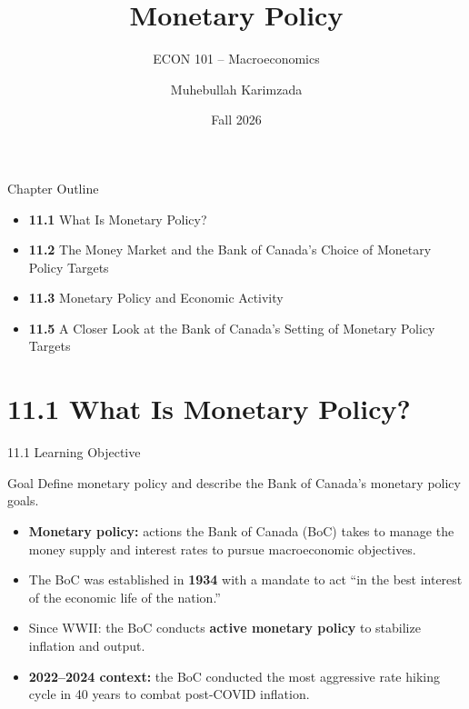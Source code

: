 \documentclass[aspectratio=169]{beamer}
\title{\textbf{Monetary Policy}}
\subtitle{{\large ECON 101 -- Macroeconomics}}
\author{Muhebullah Karimzada}
\date{Fall 2026}
\begin{document}

\begin{frame}[plain]
  \titlepage
\end{frame}

\begin{frame}{Chapter Outline}
\transfade
\begin{itemize}
  \item \textbf{11.1} What Is Monetary Policy?
  \item \textbf{11.2} The Money Market and the Bank of Canada's Choice of Monetary Policy Targets
  \item \textbf{11.3} Monetary Policy and Economic Activity
  \item \textbf{11.5} A Closer Look at the Bank of Canada's Setting of Monetary Policy Targets
\end{itemize}
\end{frame}

\section{11.1 What Is Monetary Policy?}

\begin{frame}{11.1 Learning Objective}
\transfade
\begin{block}{Goal}
Define monetary policy and describe the Bank of Canada's monetary policy goals.
\end{block}
\begin{itemize}
  \item \textbf{Monetary policy:} actions the Bank of Canada (BoC) takes to manage the money supply and interest rates to pursue macroeconomic objectives.
  \item The BoC was established in \textbf{1934} with a mandate to act ``in the best interest of the economic life of the nation.''
  \item Since WWII: the BoC conducts \textbf{active monetary policy} to stabilize inflation and output.
  \item \textbf{2022--2024 context:} the BoC conducted the most aggressive rate hiking cycle in 40 years to combat post-COVID inflation.
\end{itemize}
\end{frame}
\end{document}
